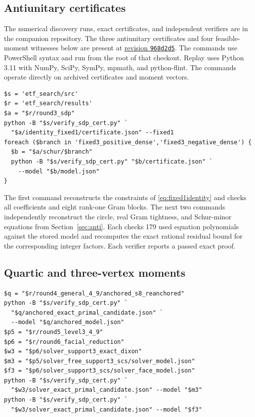 \subsection{Antiunitary certificates}

The numerical discovery runs, exact certificates, and independent verifiers are in the companion repository. The three antiunitary certificates and four feasible-moment witnesses below are present at \href{https://github.com/LinkDry/Guess/tree/968d2d5/etf_search}{revision \texttt{968d2d5}}. The commands use PowerShell syntax and run from the root of that checkout. Replay uses Python 3.11 with NumPy, SciPy, SymPy, mpmath, and python-flint. The commands operate directly on archived certificates and moment vectors.

\begin{verbatim}
$s = 'etf_search/src'
$r = 'etf_search/results'
$a = "$r/round3_sdp"
python -B "$s/verify_sdp_cert.py" `
  "$a/identity_fixed1/certificate.json" --fixed1
foreach ($branch in 'fixed3_positive_dense','fixed3_negative_dense') {
  $b = "$a/schur/$branch"
  python -B "$s/verify_sdp_cert.py" "$b/certificate.json" `
    --model "$b/model.json"
}
\end{verbatim}

The first command reconstructs the constraints of \eqref{eq:fixed1identity} and checks all coefficients and eight rank-one Gram blocks. The next two commands independently reconstruct the circle, real Gram tightness, and Schur-minor equations from Section~\ref{sec:anti}. Each checks 179 used equation polynomials against the stored model and recomputes the exact rational residual bound for the corresponding integer factors. Each verifier reports a passed exact proof.

\subsection{Quartic and three-vertex moments}

\begin{verbatim}
$q = "$r/round4_general_4_9/anchored_s8_reanchored"
python -B "$s/verify_sdp_cert.py" `
  "$q/anchored_exact_primal_candidate.json" `
  --model "$q/anchored_model.json"
$p5 = "$r/round5_level3_4_9"
$p6 = "$r/round6_facial_reduction"
$w3 = "$p6/solver_support3_exact_dixon"
$m3 = "$p5/solver_free_support3_scs/solver_model.json"
$f3 = "$p6/solver_support3_scs/solver_face_model.json"
python -B "$s/verify_sdp_cert.py" `
  "$w3/solver_exact_primal_candidate.json" --model "$m3"
python -B "$s/verify_sdp_cert.py" `
  "$w3/solver_exact_primal_candidate.json" --model "$f3"
\end{verbatim}

